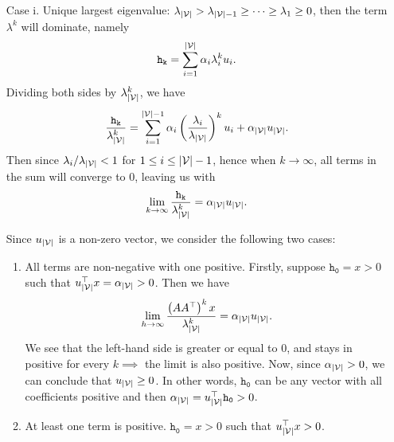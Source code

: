 \begin{enumerate}
	\item[Case i.] Unique largest eigenvalue:
		\(\lambda_{\left\vert \mathcal{\MakeUppercase{v}} \right\vert } > \lambda_{\left\vert \mathcal{\MakeUppercase{v}} \right\vert -1} \geq \cdots \geq \lambda_{1}\geq 0\),
		then the term \(\lambda^k\)	will dominate, namely
		\[
			\mathtt{h_k} = \sum\limits_{i=1}^{\left\vert \mathcal{\MakeUppercase{v}} \right\vert } \alpha_{i}\lambda_{i}^k u_{i}.
		\]
		Dividing both sides by \(\lambda_{\left\vert \mathcal{\MakeUppercase{v}} \right\vert }^k\), we have
		\[
			\frac{\mathtt{h_{k}}}{\lambda_{\left\vert \mathcal{\MakeUppercase{v}} \right\vert }^k}
			= \sum\limits_{i=1}^{\left\vert \mathcal{\MakeUppercase{v}} \right\vert  - 1}\alpha_{i}
			\left(\frac{\lambda_{i}}{\lambda_{\left\vert \mathcal{\MakeUppercase{v}} \right\vert }}\right)^k u_{i}
			+ \alpha_{\left\vert \mathcal{\MakeUppercase{v}} \right\vert }u_{\left\vert \mathcal{\MakeUppercase{v}} \right\vert }.
		\]
		Then since \(\lambda_{i}/\lambda_{\left\vert \mathcal{\MakeUppercase{v}} \right\vert }< 1\) for \(1\leq i\leq \left\vert \mathcal{\MakeUppercase{v}} \right\vert -1\),
		hence when \(k\to \infty\), all terms in the sum will converge to \(0\), leaving us with
		\[
			\lim_{k \to \infty} \frac{\mathtt{h_k}}{\lambda_{\left\vert \mathcal{\MakeUppercase{v}} \right\vert }^k}= \alpha_{\left\vert \mathcal{\MakeUppercase{v}} \right\vert } u_{\left\vert \mathcal{\MakeUppercase{v}} \right\vert }.
		\]

		Since \(u_{\left\vert \mathcal{\MakeUppercase{v}} \right\vert }\) is a non-zero vector, we consider the following two cases:
		\begin{enumerate}
			\item All terms are non-negative with one positive.
			      Firstly, suppose \(\mathtt{h_0}= x>0\) such that \(u_{\left\vert \mathcal{\MakeUppercase{v}} \right\vert }^{\top}x = \alpha_{\left\vert \mathcal{\MakeUppercase{v}} \right\vert } >0\).
			      Then we have
			      \[
				      \lim\limits_{h \to \infty} \frac{\left(A A^{\top}\right)^k x}{\lambda_{\left\vert \mathcal{\MakeUppercase{v}} \right\vert }^k} = \alpha_{\left\vert \mathcal{\MakeUppercase{v}} \right\vert }u_{\left\vert \mathcal{\MakeUppercase{v}} \right\vert }.
			      \]
			      We see that the left-hand side is greater or equal to \(0\), and stays in positive for every \(k\implies \) the limit is also positive. Now, since
			      \(\alpha_{\left\vert \mathcal{\MakeUppercase{v}} \right\vert }>0\), we can conclude that \(u_{\left\vert \mathcal{\MakeUppercase{v}} \right\vert }\geq 0\).
			      In other words, \(\mathtt{h_0}\) can be any vector with all coefficients positive and then
			      \(\alpha_{\left\vert \mathcal{\MakeUppercase{v}} \right\vert } = u^{\top}_{\left\vert \mathcal{\MakeUppercase{v}} \right\vert }\mathtt{h_0}>0\).
			\item At least one term is positive.
			      \(\mathtt{h_0} = x > 0\) such that \(u_{\left\vert \mathcal{\MakeUppercase{v}} \right\vert }^{\top}x>0\).
		\end{enumerate}


\end{enumerate}
